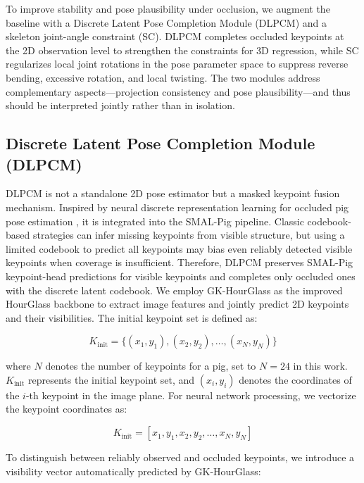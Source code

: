 \documentclass[computers,article,submit,pdftex,moreauthors]{mdpi}
\begin{document}
To improve stability and pose plausibility under occlusion, we augment the baseline with a Discrete Latent Pose Completion Module (DLPCM) and a skeleton joint-angle constraint (SC). DLPCM completes occluded keypoints at the 2D observation level to strengthen the constraints for 3D regression, while SC regularizes local joint rotations in the pose parameter space to suppress reverse bending, excessive rotation, and local twisting. The two modules address complementary aspects---projection consistency and pose plausibility---and thus should be interpreted jointly rather than in isolation.

\subsection{Discrete Latent Pose Completion Module (DLPCM)}\label{sec:dlpcm}

DLPCM is not a standalone 2D pose estimator but a masked keypoint fusion mechanism. Inspired by neural discrete representation learning for occluded pig pose estimation \cite{ref28}, it is integrated into the SMAL-Pig pipeline. Classic codebook-based strategies can infer missing keypoints from visible structure, but using a limited codebook to predict all keypoints may bias even reliably detected visible keypoints when coverage is insufficient. Therefore, DLPCM preserves SMAL-Pig keypoint-head predictions for visible keypoints and completes only occluded ones with the discrete latent codebook. We employ GK-HourGlass as the improved HourGlass backbone to extract image features and jointly predict 2D keypoints and their visibilities. The initial keypoint set is defined as:

\begin{equation}
K_{\text{init}} = \{(x_1, y_1), (x_2, y_2), \ldots, (x_N, y_N)\}
\end{equation}

where $N$ denotes the number of keypoints for a pig, set to $N = 24$ in this work. $K_{\text{init}}$ represents the initial keypoint set, and $(x_i, y_i)$ denotes the coordinates of the $i$-th keypoint in the image plane. For neural network processing, we vectorize the keypoint coordinates as:

\begin{equation}
K_{\text{init}} = [x_1, y_1, x_2, y_2, \ldots, x_N, y_N]
\end{equation}

To distinguish between reliably observed and occluded keypoints, we introduce a visibility vector automatically predicted by GK-HourGlass:
\end{document}

